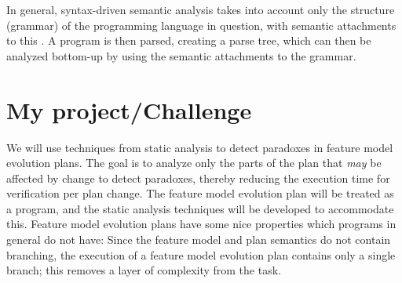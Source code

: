 \documentclass[a4paper,english]{ifimaster}
\begin{document}
In general, syntax-driven semantic analysis takes into account only the structure (grammar) of the programming language in question, with semantic attachments to this \parencite{art:syntax-driven-manurung}. A program is then parsed, creating a parse tree, which can then be analyzed bottom-up by using the semantic attachments to the grammar\parencite{article:syntax-driven-program-verification, art:inc-syntactic-semantic}.



\chapter{My project/Challenge}
\label{cha:challenge}

We will use techniques from static analysis to detect paradoxes in feature model evolution plans. The goal is to analyze only the parts of the plan that \emph{may} be affected by change to detect paradoxes, thereby reducing the execution time for verification per plan change. 
The feature model evolution plan will be treated as a program, and the static analysis techniques will be developed to accommodate this.
Feature model evolution plans have some nice properties which programs in general do not have:
Since the feature model and plan semantics do not contain branching, the execution of a feature model evolution plan contains only a single branch; this removes a layer of complexity from the task. 

\end{document}

